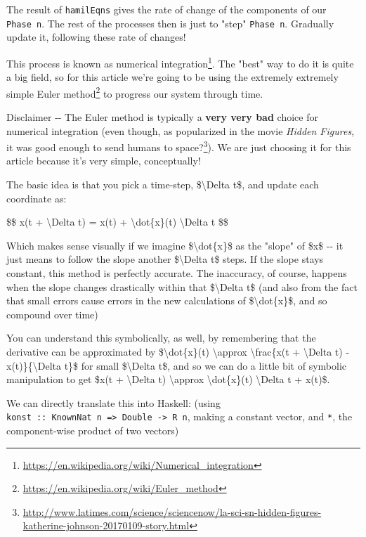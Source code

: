 \documentclass[]{article}
\renewcommand{\href}[2]{#2\footnote{\url{#1}}}
\begin{document}
The result of \texttt{hamilEqns} gives the rate of change of the components of
our \texttt{Phase\ n}. The rest of the processes then is just to "step"
\texttt{Phase\ n}. Gradually update it, following these rate of changes!

This process is known as
\href{https://en.wikipedia.org/wiki/Numerical_integration}{numerical
integration}. The "best" way to do it is quite a big field, so for this article
we're going to be using the extremely extremely simple
\href{https://en.wikipedia.org/wiki/Euler_method}{Euler method} to progress our
system through time.

Disclaimer -\/- The Euler method is typically a \textbf{very very bad} choice
for numerical integration (even though, as popularized in the movie \emph{Hidden
Figures}, it was good enough to
\href{http://www.latimes.com/science/sciencenow/la-sci-sn-hidden-figures-katherine-johnson-20170109-story.html}{send
humans to space?}). We are just choosing it for this article because it's very
simple, conceptually!

The basic idea is that you pick a time-step, \$\textbackslash{}Delta t\$, and
update each coordinate as:

\$\$ x(t + \textbackslash{}Delta t) = x(t) + \textbackslash{}dot\{x\}(t)
\textbackslash{}Delta t \$\$

Which makes sense visually if we imagine \$\textbackslash{}dot\{x\}\$ as the
"slope" of \$x\$ -\/- it just means to follow the slope another
\$\textbackslash{}Delta t\$ steps. If the slope stays constant, this method is
perfectly accurate. The inaccuracy, of course, happens when the slope changes
drastically within that \$\textbackslash{}Delta t\$ (and also from the fact that
small errors cause errors in the new calculations of
\$\textbackslash{}dot\{x\}\$, and so compound over time)

You can understand this symbolically, as well, by remembering that the
derivative can be approximated by \$\textbackslash{}dot\{x\}(t)
\textbackslash{}approx \textbackslash{}frac\{x(t + \textbackslash{}Delta t) -
x(t)\}\{\textbackslash{}Delta t\}\$ for small \$\textbackslash{}Delta t\$, and
so we can do a little bit of symbolic manipulation to get \$x(t +
\textbackslash{}Delta t) \textbackslash{}approx \textbackslash{}dot\{x\}(t)
\textbackslash{}Delta t + x(t)\$.

We can directly translate this into Haskell: (using
\texttt{konst\ ::\ KnownNat\ n\ =\textgreater{}\ Double\ -\textgreater{}\ R\ n},
making a constant vector, and \texttt{*}, the component-wise product of two
vectors)
\end{document}
